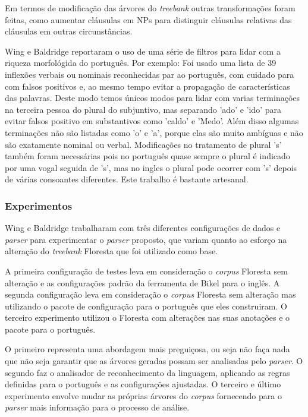 Em termos de modificação das árvores do \emph{treebank} outras transformações foram feitas, como aumentar cláusulas em NPs para distinguir cláusulas relativas das cláusulas em outras circunstâncias.

Wing e Baldridge reportaram o uso de uma série de filtros para lidar com a riqueza morfológida do português. Por exemplo: Foi usado uma lista de 39 inflexões verbais ou nominais reconhecidas par ao português, com cuidado para com falsos positivos e, ao mesmo tempo evitar a propagação de características das palavras. Deste modo temos únicos modos para lidar com varias terminações na terceira pessoa do plural do subjuntivo, mas separando 'ado' e 'ido' para evitar falsos positivo em substantivos como 'caldo' e 'Medo'. Além disso algumas terminações não são listadas como 'o' e 'a', porque elas são muito ambíguas e não são exatamente nominal ou verbal. Modificações no tratamento de plural 's' também foram necessárias pois no português quase sempre o plural é indicado por uma vogal seguida de 's', mas no ingles o plural pode ocorrer com 's' depois de várias consoantes diferentes. Este trabalho é bastante artesanal.


\subsubsection{Experimentos} %
\label{sec:wing_baldridge_experimentos}

Wing e Baldridge trabalharam com três diferentes configurações de dados e \emph{parser} para experimentar o \emph{parser} proposto, que variam quanto ao esforço na alteração do \emph{treebank} Floresta que foi utilizado como base.

A primeira configuração de testes leva em consideração o \emph{corpus} Floresta sem alteração e as configurações padrão da ferramenta de Bikel para o inglês. A segunda configuração leva em consideração o \emph{corpus} Floresta sem alteração mas utilizando o pacote de configuração para o português que eles construiram. O terceiro experimento utilizou o Floresta com alterações nas suas anotações e o pacote para o português.

O primeiro representa uma abordagem mais preguiçosa, ou seja não faça nada que não seja garantir que as árvores geradas possam ser analisadas pelo \emph{parser}. O segundo faz o analisador de reconhecimento da linguagem, aplicando as regras definidas para o português e as configurações ajustadas. O terceiro e último experimento envolve mudar as próprias árvores do \emph{corpus} fornecendo para o \emph{parser} mais informação para o processo de análise.

